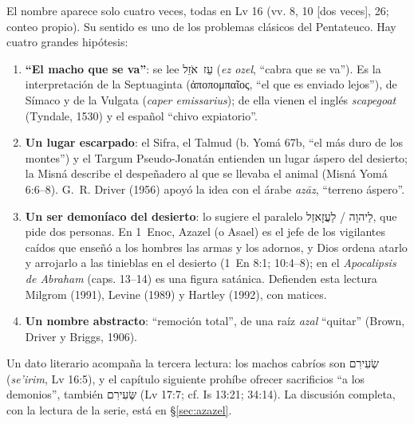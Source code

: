 \documentclass[11pt,letterpaper]{article}
\newcommand{\heb}[1]{\mbox{\foreignlanguage{hebrew}{#1}}}
\newcommand{\grc}[1]{\foreignlanguage{ancientgreek}{#1}}
\begin{document}
\begin{filologia}[\heb{עֲזָאזֵל} \emph{Azazel}]
El nombre aparece solo cuatro veces, todas en Lv 16 (vv. 8, 10 [dos veces], 26; conteo propio). Su sentido es uno de los problemas clásicos del Pentateuco. Hay cuatro grandes hipótesis:
\begin{enumerate}\setlength{\itemsep}{0pt}
\item \textbf{``El macho que se va''}: se lee \heb{עֵז אֹזֵל} (\emph{ez ozel}, ``cabra que se va''). Es la interpretación de la Septuaginta (\grc{ἀποπομπαῖος}, ``el que es enviado lejos''), de Símaco y de la Vulgata (\emph{caper emissarius}); de ella vienen el inglés \emph{scapegoat} (Tyndale, 1530) y el español ``chivo expiatorio''.
\item \textbf{Un lugar escarpado}: el Sifra, el Talmud (b. Yomá 67b, ``el más duro de los montes'') y el Targum Pseudo-Jonatán entienden un lugar áspero del desierto; la Misná describe el despeñadero al que se llevaba el animal (Misná Yomá 6:6--8). G.~R. Driver (1956) apoyó la idea con el árabe \emph{azāz}, ``terreno áspero''.
\item \textbf{Un ser demoníaco del desierto}: lo sugiere el paralelo \heb{לַיהוָה} / \heb{לַעֲזָאזֵל}, que pide dos personas. En 1~Enoc, Azazel (o Asael) es el jefe de los vigilantes caídos que enseñó a los hombres las armas y los adornos, y Dios ordena atarlo y arrojarlo a las tinieblas en el desierto (1~En 8:1; 10:4--8); en el \emph{Apocalipsis de Abraham} (caps. 13--14) es una figura satánica. Defienden esta lectura Milgrom (1991), Levine (1989) y Hartley (1992), con matices.
\item \textbf{Un nombre abstracto}: ``remoción total'', de una raíz \emph{azal} ``quitar'' (Brown, Driver y Briggs, 1906).
\end{enumerate}
Un dato literario acompaña la tercera lectura: los machos cabríos son \heb{שְׂעִירִם} (\emph{se'irim}, Lv 16:5), y el capítulo siguiente prohíbe ofrecer sacrificios ``a los demonios'', también \heb{שְּׂעִירִם} (Lv 17:7; cf. Is 13:21; 34:14). La discusión completa, con la lectura de la serie, está en §\ref{sec:azazel}.
\end{filologia}
\end{document}
